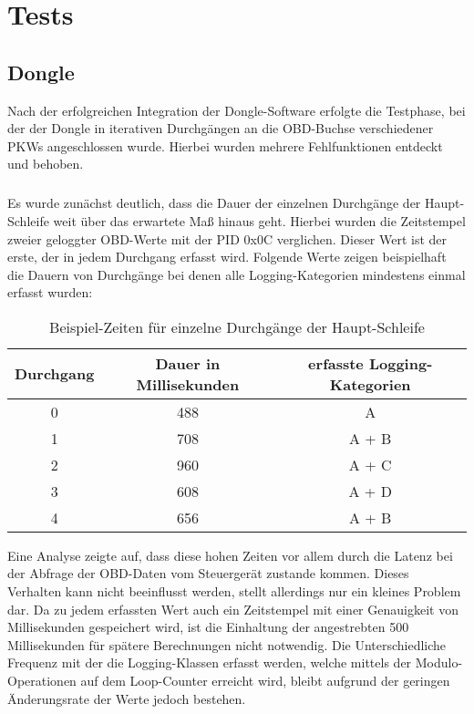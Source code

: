 \chapter{Tests}
\label{sec:test}

\section{Dongle}
\label{sec:dongleTest}
Nach der erfolgreichen Integration der Dongle-Software erfolgte die Testphase, bei der der Dongle in iterativen Durchgängen an die OBD-Buchse verschiedener PKWs angeschlossen wurde. Hierbei wurden mehrere Fehlfunktionen entdeckt und behoben.
\paragraph{}
Es wurde zunächst deutlich, dass die Dauer der einzelnen Durchgänge der Haupt-Schleife weit über das erwartete Maß hinaus geht. Hierbei wurden die Zeitstempel zweier geloggter OBD-Werte mit der PID 0x0C verglichen. Dieser Wert ist der erste, der in jedem Durchgang erfasst wird. Folgende Werte zeigen beispielhaft die Dauern von Durchgänge bei denen alle Logging-Kategorien mindestens einmal erfasst wurden:
\begin{table}
  \caption{Beispiel-Zeiten für einzelne Durchgänge der Haupt-Schleife}
  \label{tab:loopTimes}

  \begin{center}
    \begin{tabular}{|c|c|c|}
    \hline
      Durchgang & Dauer in Millisekunden & erfasste Logging-Kategorien\\ \hline
      0 & 488 & A\\ \hline
      1 & 708 & A + B\\ \hline
      2 & 960 & A + C\\ \hline
      3 & 608 & A + D\\ \hline
      4 & 656 & A + B\\ \hline
    \end{tabular}
  \end{center}
\end{table}
Eine Analyse zeigte auf, dass diese hohen Zeiten vor allem durch die Latenz bei der Abfrage der OBD-Daten vom Steuergerät zustande kommen. Dieses Verhalten kann nicht beeinflusst werden, stellt allerdings nur ein kleines Problem dar. Da zu jedem erfassten Wert auch ein Zeitstempel mit einer Genauigkeit von  Millisekunden gespeichert wird, ist die Einhaltung der angestrebten 500 Millisekunden für spätere Berechnungen nicht notwendig. Die Unterschiedliche Frequenz mit der die Logging-Klassen erfasst werden, welche mittels der Modulo-Operationen auf dem Loop-Counter erreicht wird, bleibt aufgrund der geringen Änderungsrate der Werte jedoch bestehen.
